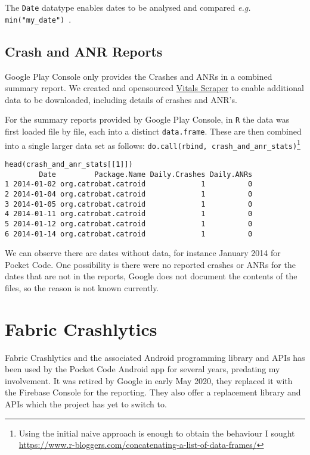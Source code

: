 
The \texttt{Date} datatype enables dates to be analysed and compared \emph{e.g.} \texttt{min("my\_date")}~\cite{r_bloggers_date_formats_in_r}.


\subsection{Crash and ANR Reports}
Google Play Console only provides the Crashes and ANRs in a combined summary report. We created and opensourced \href{https://github.com/commercetest/vitals-scraper}{Vitals Scraper} to enable additional data to be downloaded, including details of crashes and ANR's.

For the summary reports provided by Google Play Console, in \texttt{R} the data was first loaded file by file, each into a distinct \texttt{data.frame}. These are then combined into a single larger data set as follows:  
\texttt{do.call(rbind, crash\_and\_anr\_stats)}\footnote{Using the initial naive approach is enough to obtain the behaviour I sought \url{https://www.r-bloggers.com/concatenating-a-list-of-data-frames/}}

\begin{lstlisting}
head(crash_and_anr_stats[[1]])
        Date         Package.Name Daily.Crashes Daily.ANRs
1 2014-01-02 org.catrobat.catroid             1          0
2 2014-01-04 org.catrobat.catroid             1          0
3 2014-01-05 org.catrobat.catroid             1          0
4 2014-01-11 org.catrobat.catroid             1          0
5 2014-01-12 org.catrobat.catroid             1          0
6 2014-01-14 org.catrobat.catroid             1          0
\end{lstlisting}

We can observe there are dates without data, for instance  January 2014 for Pocket Code. One possibility is there were no reported crashes or ANRs for the dates that are not in the reports, Google does not document the contents of the files, so the reason is not known currently.

\section{Fabric Crashlytics}
Fabric Crashlytics and the associated Android programming library and APIs has been used by the Pocket Code Android app for several years, predating my involvement. It was retired by Google in early May 2020, they replaced it with the Firebase Console for the reporting. They also offer a replacement library and APIs which the project has  yet to switch to.

